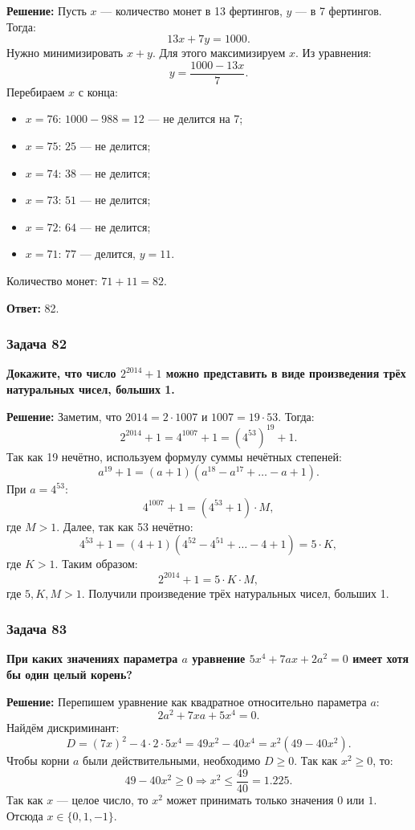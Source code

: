 \documentclass[12pt, a4paper]{article}
\begin{document}
\textbf{Решение:}
Пусть $x$ — количество монет в 13 фертингов, $y$ — в 7 фертингов. Тогда:
\[
13x + 7y = 1000.
\]
Нужно минимизировать $x+y$. Для этого максимизируем $x$. Из уравнения:
\[
y = \frac{1000 - 13x}{7}.
\]
Перебираем $x$ с конца:
\begin{itemize}
    \item $x = 76$: $1000 - 988 = 12$ — не делится на 7;
    \item $x = 75$: $25$ — не делится;
    \item $x = 74$: $38$ — не делится;
    \item $x = 73$: $51$ — не делится;
    \item $x = 72$: $64$ — не делится;
    \item $x = 71$: $77$ — делится, $y = 11$.
\end{itemize}
Количество монет: $71 + 11 = 82$.

\textbf{Ответ:} 82.

\subsubsection*{Задача 82}
\textbf{Докажите, что число $2^{2014} + 1$ можно представить в виде произведения трёх натуральных чисел, больших 1.}

\textbf{Решение:}
Заметим, что $2014 = 2 \cdot 1007$ и $1007 = 19 \cdot 53$. Тогда:
\[
2^{2014} + 1 = 4^{1007} + 1 = (4^{53})^{19} + 1.
\]
Так как 19 нечётно, используем формулу суммы нечётных степеней:
\[
a^{19} + 1 = (a+1)(a^{18} - a^{17} + \ldots - a + 1).
\]
При $a = 4^{53}$:
\[
4^{1007} + 1 = (4^{53} + 1) \cdot M,
\]
где $M > 1$. Далее, так как 53 нечётно:
\[
4^{53} + 1 = (4+1)(4^{52} - 4^{51} + \ldots - 4 + 1) = 5 \cdot K,
\]
где $K > 1$.
Таким образом:
\[
2^{2014} + 1 = 5 \cdot K \cdot M,
\]
где $5, K, M > 1$. Получили произведение трёх натуральных чисел, больших 1.

\subsubsection*{Задача 83}
\textbf{При каких значениях параметра $a$ уравнение $5x^4 + 7ax + 2a^2 = 0$ имеет хотя бы один целый корень?}

\textbf{Решение:}
Перепишем уравнение как квадратное относительно параметра $a$:
\[
2a^2 + 7xa + 5x^4 = 0.
\]
Найдём дискриминант:
\[
D = (7x)^2 - 4 \cdot 2 \cdot 5x^4 = 49x^2 - 40x^4 = x^2(49 - 40x^2).
\]
Чтобы корни $a$ были действительными, необходимо $D \ge 0$. Так как $x^2 \ge 0$, то:
\[
49 - 40x^2 \ge 0 \Rightarrow x^2 \le \frac{49}{40} = 1.225.
\]
Так как $x$ — целое число, то $x^2$ может принимать только значения $0$ или $1$. Отсюда $x \in \{0, 1, -1\}$.
\end{document}
